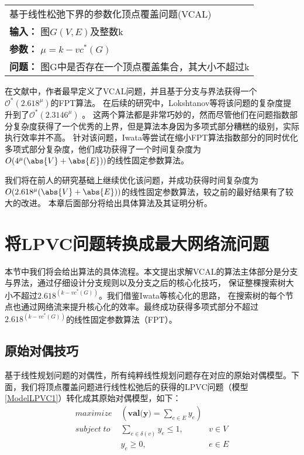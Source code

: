 \begin{tabular}{| p{0.9\headwidth} |}
  \hline
  基于线性松弛下界的参数化顶点覆盖问题(VCAL) \\
  \textbf{输入：} 图$G(V, E)$及整数k \\
  \textbf{参数：} $\mu = k - vc^*(G)$\\
  \textbf{问题：} 图G中是否存在一个顶点覆盖集合，其大小不超过k\\
  \hline
\end{tabular} \vspace{0.5cm}


在文献\cite{narayanaswamy2012lp}中，作者最早定义了VCAL问题，并且基于分支与界法获得一个$\mathcal{O}^*(2.618^{\mu})$的FPT算法。
在后续的研究中，Lokshtanov等将该问题的复杂度提升到了$\mathcal{O}^*(2.3146^{\mu})$ 。
这两个算法都是非常巧妙的，然而尽管他们在问题指数部分复杂度获得了一个优秀的上界，但是算法本身因为多项式部分糟糕的级别，实际执行效率并不高。
针对该问题，Iwata等尝试在缩小FPT算法指数部分的同时优化多项式部分复杂度，他们成功获得了一个时间复杂度为$O(4^{\mu}(\abs{V} + \abs{E}))$的线性固定参数算法。

我们将在前人的研究基础上继续优化该问题，并成功获得时间复杂度为$O(2.618^{\mu}(\abs{V} + \abs{E}))$的线性固定参数算法，较之前的最好结果有了较大的改进。
本章后面部分将给出具体算法及其证明分析。


\section{将LPVC问题转换成最大网络流问题}
本节中我们将会给出算法的具体流程。本文提出求解VCAL的算法主体部分是分支与界法，通过仔细设计分支规则以及分支之后的核心化技巧，
保证整棵搜索树大小不超过$2.618^(k-vc^*(G))$。我们借鉴Iwata等核心化的思路，
在搜索树的每个节点也通过网络流来提升核心化的效率。最终成功获得多项式部分不超过$2.618^(k-vc^*(G))$的线性固定参数算法（FPT）。
\subsection{原始对偶技巧}
基于线性规划问题的对偶性，所有纯粹线性规划问题存在对应的原始对偶模型。下面，我们将顶点覆盖问题进行线性松弛后的获得的LPVC问题（模型\ref{ModelLPVC1}）转化成其原始对偶模型，如下：
\begin{equation} \label{ModelLPVC2} \begin{aligned}
  maximize\; & (\textbf{val(y)} = \sum_{e \in E}{y_e}) &\\
  subject\; to\; & \sum_{e \in \delta(v)}{y_e \le 1}, & v \in V \\
   & y_e \ge 0, & e \in E
\end{aligned} \end{equation}


